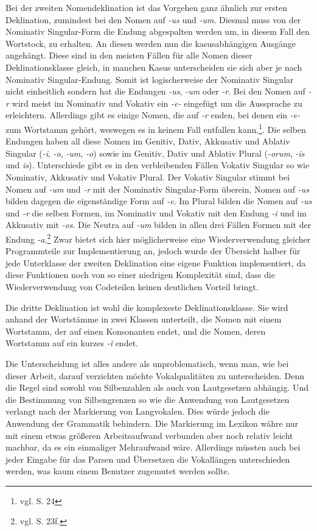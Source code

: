 Bei der zweiten Nomendeklination ist das Vorgehen ganz ähnlich zur ersten Deklination, zumindest bei den Nomen auf \textit{-us} und \textit{-um}. Diesmal muss von der Nominativ Singular-Form die Endung abgespalten werden um, in diesem Fall den Wortstock, zu erhalten. An diesen werden nun die kasusabhängigen Ausgänge angehängt. Diese sind in den meisten Fällen für alle Nomen dieser Deklinationsklasse gleich, in manchen Kasus unterscheiden sie sich aber je nach Nominativ Singular-Endung. Somit ist logischerweise der Nominativ Singular nicht einheitlich sondern hat die Endungen \textit{-us}, \textit{-um} oder \textit{-r}. Bei den Nomen auf \textit{-r} wird meist im Nominativ und Vokativ ein \textit{-e-} eingefügt um die Aussprache zu erleichtern. Allerdings gibt es einige Nomen, die auf \textit{-r} enden, bei denen ein \textit{-e-} zum Wortstamm gehört, weswegen es in keinem Fall entfallen kann.\footnote{vgl. \cite{BAYER-LINDAUER1994} S. 24}. Die selben Endungen haben all diese Nomen im Genitiv, Dativ, Akkusativ und Ablativ Singular (\textit{-i}, \textit{-o}, \textit{-um}, \textit{-o}) sowie im Genitiv, Dativ und Ablativ Plural (\textit{-orum}, \textit{-is} und \textit{is}). Unterschiede gibt es in den verbleibenden Fällen Vokativ Singular so wie Nominativ, Akkusativ und Vokativ Plural. Der Vokativ Singular stimmt bei Nomen auf \textit{-um} und \textit{-r} mit der Nominativ Singular-Form überein, Nomen auf \textit{-us} bilden dagegen die eigenständige Form auf \textit{-e}. Im Plural bilden die Nomen auf \textit{-us} und \textit{-r} die selben Formen, im Nominativ und Vokativ mit den Endung \textit{-i} und im Akkusativ mit \textit{-os}. Die Neutra auf \textit{-um} bilden in allen drei Fällen Formen mit der Endung \textit{-a}.\footnote{vgl. \cite{BAYER-LINDAUER1994} S. 23f.} Zwar bietet sich hier möglicherweise eine Wiederverwendung gleicher Programmteile zur Implementierung an, jedoch wurde der Übersicht halber für jede Unterklasse der zweiten Deklination eine eigene Funktion implementiert, da diese Funktionen noch von so einer niedrigen Komplexität sind, dass die Wiederverwendung von Codeteilen keinen deutlichen Vorteil bringt. \par
Die dritte Deklination ist wohl die komplexeste Deklinationsklasse. Sie wird anhand der Wortstämme in zwei Klassen unterteilt, die Nomen mit einem Wortstamm, der auf einen Konsonanten endet, und die Nomen, deren Wortstamm auf ein kurzes \textit{-ǐ} endet. \par
Die Unterscheidung ist alles andere als unproblematisch, wenn man, wie bei dieser Arbeit, darauf verzichten möchte Vokalqualitäten zu unterscheiden. Denn die Regel sind sowohl von Silbenzahlen als auch von Lautgesetzen abhängig. Und die Bestimmung von Silbengrenzen so wie die Anwendung von Lautgesetzen verlangt nach der Markierung von Langvokalen. Dies würde jedoch die Anwendung der Grammatik behindern. Die Markierung im Lexikon währe nur mit einem etwas größeren Arbeitsaufwand verbunden aber noch relativ leicht machbar, da es ein einmaliger Mehraufwand wäre. Allerdings müssten auch bei jeder Eingabe für das Parsen und Übersetzen die Vokallängen unterschieden werden, was kaum einem Benutzer zugemutet werden sollte. \par
